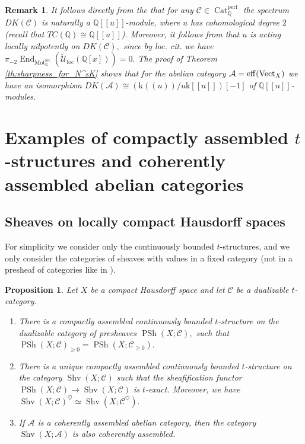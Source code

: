 \documentclass[11pt,leqno]{amsart}
\newtheorem{prop}[theo]{Proposition}
\newtheorem{remark}[theo]{Remark}
\numberwithin{equation}{section}
\def\Q{\mathbb{Q}}
\def\wt{\widetilde}
\def\End{\operatorname{End}}
\newcommand{\Mot}{\operatorname{Mot}}
\newcommand{\Cat}{\operatorname{Cat}}
\newcommand{\loc}{\operatorname{loc}}
\newcommand{\eff}{\operatorname{eff}}
\newcommand{\mk}{\mathrm k}
\newcommand{\cA}{{\mathcal A}}
\newcommand{\cC}{{\mathcal C}}
\newcommand{\cU}{{\mathcal U}}
\newcommand{\perf}{\operatorname{perf}}
\newcommand{\PSh}{\operatorname{PSh}}
\newcommand{\Shv}{\operatorname{Shv}}
\newcommand{\Vect}{{\rm Vect}}
\begin{document}
\begin{remark}
It follows directly from the \cite[Theorem 9.3]{E25c} that for any $\cC\in\Cat_{\Q}^{\perf}$ the spectrum $DK(\cC)$ is naturally a $\Q[[u]]$-module, where $u$ has cohomological degree $2$ (recall that $TC(\Q)\cong\Q[[u]]$). Moreover, it follows from \cite[Theorem 9.1]{E25c} that $u$ is acting locally nilpotently on $DK(\cC),$ since by loc. cit. we have $\pi_{-2}\End_{\Mot^{\loc}_{\Q}}(\wt{\cU}_{\loc}(\Q[x]))=0.$ The proof of Theorem \ref{th:sharpness_for_N^sK} shows that for the abelian category $\cA=\eff(\Vect_X)$ we have an isomorphism $DK(\cA)\cong (\mk((u))/u \mk[[u]])[-1]$ of $\Q[[u]]$-modules.
\end{remark}

\section{Examples of compactly assembled $t$-structures and coherently assembled abelian categories}
\label{sec:examples_of_comp_ass_and_coh_ass}

\subsection{Sheaves on locally compact Hausdorff spaces}

For simplicity we consider only the continuously bounded $t$-structures, and we only consider the categories of sheaves with values in a fixed category (not in a presheaf of categories like in \cite[Sections 6.2-6.4]{E24}).

\begin{prop}\label{prop:t_structure_on_sheaves}
Let $X$ be a compact Hausdorff space and let $\cC$ be a dualizable $t$-category. 

\begin{enumerate}[label=(\roman*),ref=(\roman*)]
	\item There is a compactly assembled continuously bounded $t$-structure on the dualizable category of presheaves $\PSh(X;\cC),$ such that $\PSh(X;\cC)_{\geq 0}=\PSh(X;\cC_{\geq 0}).$  \label{t_structure_PSh}
	\item There is a unique compactly assembled continuously bounded $t$-structure on the category $\Shv(X;\cC)$ such that the sheafification functor $\PSh(X;\cC)\to \Shv(X;\cC)$ is $t$-exact. Moreover, we have $\Shv(X;\cC)^{\heartsuit}\simeq\Shv(X;\cC^{\heartsuit}).$ \label{t_structure_Sh}
\item If $\cA$ is a coherently assembled abelian category, then the category $\Shv(X;\cA)$ is also coherently assembled. \label{Sh_is_coherently_assembled}
\end{enumerate}
\end{prop}
\end{document}
